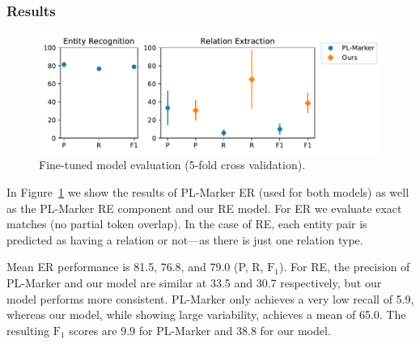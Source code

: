 \subsubsection{Results}



\begin{figure}[tb]
  \centering
  \includegraphics[width=.8\linewidth]{figures/ref_params/fine_tuned_eval}
  \caption{Fine-tuned model evaluation (5-fold cross validation).}
  \label{fig:finetunedeval}
\end{figure}

In Figure~\ref{fig:finetunedeval} we show the results of PL-Marker ER (used for both models) as well as the PL-Marker RE component and our RE model. For ER we evaluate exact matches (no partial token overlap). In the case of RE, each entity pair is predicted as having a relation or not---as there is just one relation type.

Mean ER performance is 81.5, 76.8, and 79.0 (P, R, $\text{F}_1$). For RE, the precision of PL-Marker and our model are similar at 33.5 and 30.7 respectively, but our model performs more consistent. PL-Marker only achieves a very low recall of 5.9, whereas our model, while showing large variability, achieves a mean of 65.0. The resulting $\text{F}_1$ scores are 9.9 for PL-Marker and 38.8 for our model.



